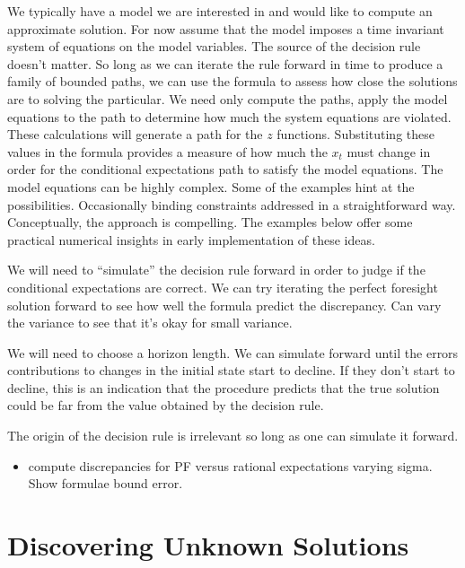 \documentclass[12pt]{article}
\begin{document}
We typically have a model we are interested in and would like to compute an approximate solution.  For now assume that the model imposes a time invariant system of equations on the model variables.
The source of the decision rule doesn't matter.  So long as we can iterate the
rule forward in time to produce a family of bounded paths, we can use the
formula to assess how close the solutions are to solving the particular.
We need only compute the paths, apply the model equations to the path to determine how much the system equations are violated.  These calculations will 
generate a path for the $z$ functions.  Substituting these values in the
formula provides a measure of how much the $x_t$ must change in order for the conditional expectations path to satisfy the model equations.
The model equations can be highly complex. Some of the examples hint at the 
possibilities. Occasionally binding constraints addressed in a straightforward 
way.  Conceptually, the approach is compelling.  The examples below
offer some practical numerical insights in early implementation of these
ideas.



We will need to ``simulate'' the decision rule forward in order to judge if the conditional expectations are correct.
We can try iterating the perfect foresight solution forward to see how well the formula predict the discrepancy.  Can vary the variance to see that it's okay for small variance.

We will need to choose a horizon length. We can simulate forward until the errors contributions to changes in the initial state start to decline.
If they don't start to decline, this is an indication that the procedure 
predicts that the true solution could be far from the value obtained by the
decision rule.

The origin of the decision rule is irrelevant so long as one can simulate it 
forward.

\begin{itemize}
\item compute discrepancies for PF versus rational expectations varying sigma.
Show formulae bound error.
\end{itemize}




\section{Discovering Unknown Solutions}
\label{sec:unknown-solutions}
\end{document}
